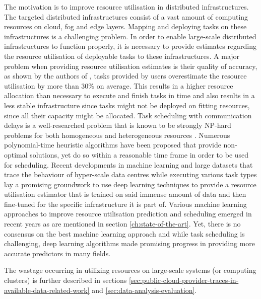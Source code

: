             The motivation is to improve resource utilisation in distributed infrastructures. The targeted distributed infrastructures consist of a vast amount of computing resources on cloud, fog and edge layers.
            Mapping and deploying tasks on these infrastructures is a challenging problem. In order to enable large-scale distributed infrastructures to function properly, it is necessary to provide estimates regarding the resource utilisation of deployable tasks to these infrastructures.
            A major problem when providing resource utilisation estimates is their quality of accuracy, as shown by the authors of \cite{thonglekImprovingResourceUtilization2019}, tasks provided by users overestimate the resource utilisation by more than $30\%$ on average. 
            This results in a higher resource allocation than necessary to execute and finish tasks in time and also results in a less stable infrastructure since tasks might not be deployed on fitting resources, since all their capacity might be allocated.
            Task scheduling with communication delays is a well-researched problem that is known to be strongly NP-hard problems for both homogeneous and heterogeneous resources \cite{orrOptimalTaskScheduling2021}.
            Numerous polynomial-time heuristic algorithms have been proposed that provide non-optimal solutions, yet do so within a reasonable time frame in order to be used for scheduling. Recent developments in machine learning and large datasets that trace the behaviour of hyper-scale data centres \cite{vanooteghemWhatHyperscaleData2023} while executing various task types lay a promising groundwork to use deep learning techniques to provide a resource utilisation estimator that is trained on said immense amount of data and then fine-tuned for the specific infrastructure it is part of. 
            Various machine learning approaches to improve resource utilisation prediction and scheduling emerged in recent years as are mentioned in section \ref{ch:state-of-the-art}. Yet, there is no consensus on the best machine learning approach and while task scheduling is challenging, 
            deep learning algorithms made promising progress in providing more accurate predictors in many fields.

            The wastage occurring in utilizing resources on large-scale systems (or computing clusters) is further described in sections \ref{sec:public-cloud-provider-traces-in-available-data-related-work} and \ref{sec:data-analysis-evaluation}.

